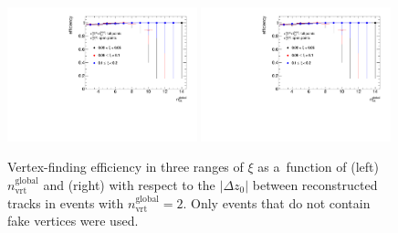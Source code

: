 \begin{figure}[h!]
	\centering
	\includegraphics[width=0.49\textwidth,page=1]{chapters/chrgSTAR/img/vertex/vertexEffi_ksi_noFake.pdf}
	\includegraphics[width=0.49\textwidth,page=8]{chapters/chrgSTAR/img/vertex/vertexEffi_ksi_noFake.pdf}
	\caption{Vertex-finding efficiency in three ranges of $\xi$ as a~function of  (left) $n^\textrm{global}_\textrm{vrt}$ and (right) with respect to the $|\Delta z_0|$ between reconstructed tracks in events with $n^\textrm{global}_\textrm{vrt}=2$. Only events that do not contain fake vertices were used. }
	\label{fig:vertexEffi_noFake}
\end{figure}

